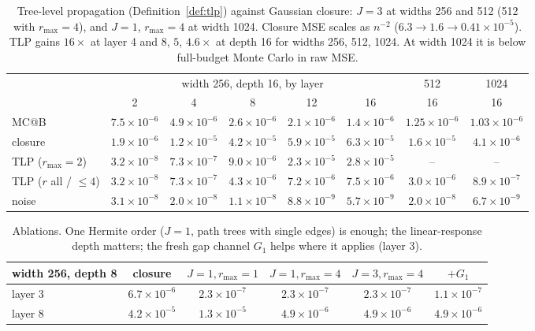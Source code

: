 \documentclass[11pt]{article}
\theoremstyle{definition}
\theoremstyle{remark}
\begin{document}
\begin{table}[h]\centering\footnotesize\setlength{\tabcolsep}{3pt}
\begin{tabular}{@{}lccccccc@{}}
\toprule
& \multicolumn{5}{c}{width 256, depth 16, by layer} & 512 & 1024\\
\cmidrule(lr){2-6}\cmidrule(lr){7-7}\cmidrule(lr){8-8}
 & 2 & 4 & 8 & 12 & 16 & 16 & 16\\
\midrule
MC@B & $7.5\times10^{-6}$ & $4.9\times10^{-6}$ & $2.6\times10^{-6}$ & $2.1\times10^{-6}$ & $1.4\times10^{-6}$ & $1.25\times10^{-6}$ & $1.03\times10^{-6}$\\
closure & $1.9\times10^{-6}$ & $1.2\times10^{-5}$ & $4.2\times10^{-5}$ & $5.9\times10^{-5}$ & $6.3\times10^{-5}$ & $1.6\times10^{-5}$ & $4.1\times10^{-6}$\\
TLP ($r_{\max}=2$) & $3.2\times10^{-8}$ & $7.3\times10^{-7}$ & $9.0\times10^{-6}$ & $2.3\times10^{-5}$ & $2.8\times10^{-5}$ & -- & --\\
TLP ($r$ all / $\le4$) & $3.2\times10^{-8}$ & $7.3\times10^{-7}$ & $4.3\times10^{-6}$ & $7.2\times10^{-6}$ & $7.5\times10^{-6}$ & $3.0\times10^{-6}$ & $8.9\times10^{-7}$\\
noise & $3.1\times10^{-8}$ & $2.0\times10^{-8}$ & $1.1\times10^{-8}$ & $8.8\times10^{-9}$ & $5.7\times10^{-9}$ & $2.0\times10^{-8}$ & $6.7\times10^{-9}$\\
\bottomrule
\end{tabular}
\caption{Tree-level propagation (Definition~\ref{def:tlp}) against Gaussian closure: $J=3$ at widths 256 and 512 (512 with $r_{\max}=4$), and $J=1$, $r_{\max}=4$ at width 1024. Closure MSE scales as $n^{-2}$ ($6.3\to1.6\to0.41\times10^{-5}$). TLP gains $16\times$ at layer 4 and $8$, $5$, $4.6\times$ at depth 16 for widths 256, 512, 1024. At width 1024 it is below full-budget Monte Carlo in raw MSE.}\label{tab:tlp}
\end{table}

\begin{table}[h]\centering\small
\begin{tabular}{@{}lccccc@{}}
\toprule
width 256, depth 8 & closure & $J{=}1,r_{\max}{=}1$ & $J{=}1,r_{\max}{=}4$ & $J{=}3,r_{\max}{=}4$ & $+G_1$\\
\midrule
layer 3 & $6.7\times10^{-6}$ & $2.3\times10^{-7}$ & $2.3\times10^{-7}$ & $2.3\times10^{-7}$ & $1.1\times10^{-7}$\\
layer 8 & $4.2\times10^{-5}$ & $1.3\times10^{-5}$ & $4.9\times10^{-6}$ & $4.9\times10^{-6}$ & $4.9\times10^{-6}$\\
\bottomrule
\end{tabular}
\caption{Ablations. One Hermite order ($J=1$, path trees with single edges) is enough; the linear-response depth matters; the fresh gap channel $G_1$ helps where it applies (layer 3).}\label{tab:ablate}
\end{table}
\end{document}
